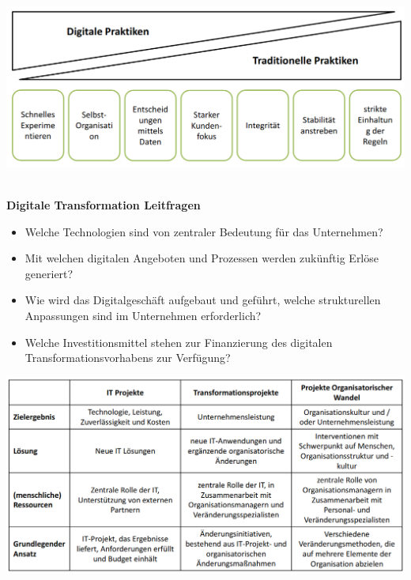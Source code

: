 \documentclass[a4]{scrartcl}
\begin{document}
\ \\

\includegraphics[scale=0.3]{altneu.png}

\ \\

\textbf{Digitale Transformation Leitfragen}

\begin{itemize}
\item Welche Technologien sind von zentraler Bedeutung für das Unternehmen?
\item Mit welchen digitalen Angeboten und Prozessen werden zukünftig Erlöse generiert?
\item Wie wird das Digitalgeschäft aufgebaut und geführt, welche strukturellen Anpassungen sind im Unternehmen erforderlich?
\item Welche Investitionsmittel stehen zur Finanzierung des digitalen Transformationsvorhabens zur Verfügung?
\end{itemize}

\includegraphics[scale=0.3]{ziele.png}
\end{document}
